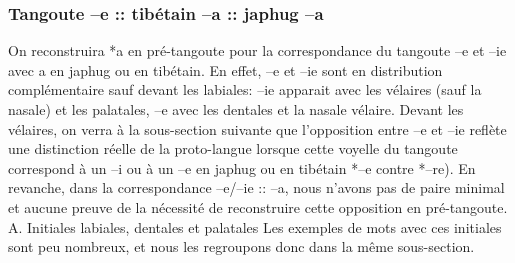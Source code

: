 \documentclass[oldfontcommands,twoside,a4paper,11pt,draft]{memoir}
\begin{document}
\subsubsection{Tangoute --e :: tibétain --a :: japhug --a}	\label{subsubsec:correspondance:e:a:a}
On reconstruira *a en pré-tangoute pour la correspondance du tangoute --e et --ie avec a en japhug ou en tibétain. En effet, --e et --ie sont en distribution complémentaire sauf devant les labiales: --ie apparait avec les vélaires (sauf la nasale) et les palatales, --e avec les dentales et la nasale vélaire. Devant les vélaires, on verra à la sous-section suivante que l'opposition entre --e et --ie reflète une distinction réelle de la proto-langue lorsque cette voyelle du tangoute correspond à un --i ou à un --e en japhug ou en tibétain *--e contre *--re). En revanche, dans la correspondance --e/--ie :: --a, nous n'avons pas de paire minimal et aucune preuve de la nécessité de reconstruire cette opposition en pré-tangoute. 
\newline
\linebreak
A. Initiales labiales, dentales et palatales \label{rimes:02:3:lab}
Les exemples de mots avec ces initiales sont peu nombreux, et nous les regroupons donc dans la même sous-section.
\end{document}

